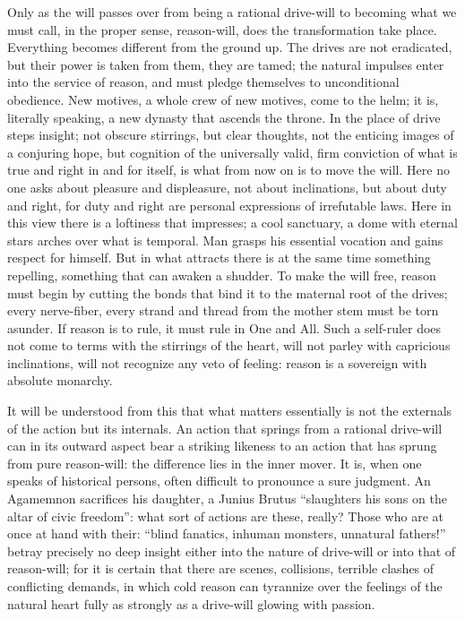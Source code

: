 \documentclass[12pt,a4paper,openany]{book}
\newcommand{\opage}[1]{\marginnote{\footnotesize\textit{[#1]}}}
\begin{document}
Only as the will passes over from being a rational drive-will to becoming what we must call, in the proper
\setcounter{footnote}{0}%
\opage{24}sense, reason-will, does the transformation take place. Everything becomes different from the ground up. The drives
are not eradicated, but their power is taken from them, they are tamed; the natural impulses enter into the service of
reason, and must pledge themselves to unconditional obedience. New motives, a whole crew of new motives, come to the helm;
it is,
literally speaking, a new dynasty that ascends the throne. In the place of drive steps insight; not obscure stirrings, but
clear thoughts, not the enticing images of a conjuring hope, but cognition of the universally valid, firm conviction of what
is true and right in and for itself, is what from now on is to move the will. Here no one asks about pleasure and
displeasure, not about inclinations, but about duty and right, for duty and right are personal expressions of irrefutable
laws. Here in this view there is a loftiness that impresses; a cool sanctuary, a dome with eternal stars arches over what is
temporal. Man grasps his essential vocation and gains respect for himself. But in what attracts there is at the same time
something repelling, something that can awaken a shudder. To make the will free, reason must begin by cutting the bonds that
bind it to the maternal root of the drives; every nerve-fiber, every strand and thread from the mother stem must be torn
asunder. If reason is to rule, it must rule in One and All. Such a self-ruler does not come to terms with the stirrings of the
heart, will not parley with capricious inclinations, will not recognize any veto of feeling: reason is a sovereign with
absolute monarchy.

It will be understood from this that what matters essentially is not the externals of the action but its internals. An action
that springs from a rational drive-will can in its outward aspect bear a striking likeness to an action that has sprung from
pure reason-will: the difference lies in the inner mover. It is, when one speaks of historical persons, often difficult to
pronounce a sure judgment. An Agamemnon sacrifices his daughter, a Junius Brutus ``slaughters his sons on the altar of civic
\setcounter{footnote}{0}%
\opage{25}freedom'': what sort of actions are these, really? Those who are at once at hand with their: ``blind fanatics,
inhuman monsters, unnatural fathers!'' betray precisely no deep insight either into the nature of drive-will or into that of
reason-will; for it is certain that there are scenes, collisions, terrible clashes of conflicting demands, in which cold
reason can tyrannize over the feelings of the natural heart fully as strongly as a drive-will glowing with passion.
\end{document}
